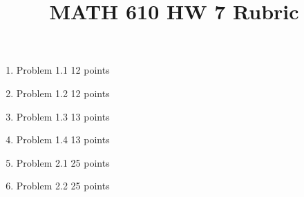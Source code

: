 \documentclass{article}
\title{MATH 610 HW 7 Rubric}
\author{}
\date{}
\begin{document}
\maketitle

\begin{enumerate}
	\item Problem 1.1 12 points
	\item Problem 1.2 12 points
	\item Problem 1.3 13 points
	\item Problem 1.4 13 points
	\item Problem 2.1 25 points
	\item Problem 2.2 25 points
\end{enumerate}
\end{document}
